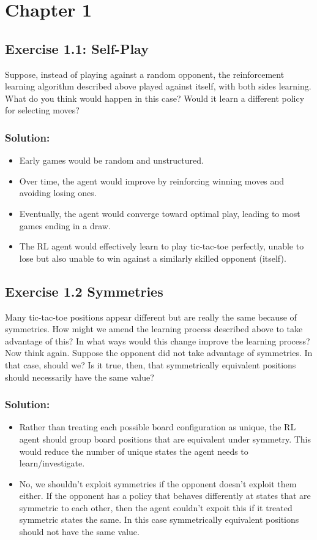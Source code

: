\section*{Chapter 1}

\subsection*{Exercise 1.1: Self-Play} 
Suppose, instead of playing against a random opponent, the
reinforcement learning algorithm described above played against itself, with both sides
learning. What do you think would happen in this case? Would it learn a different policy
for selecting moves? 

\subsubsection*{Solution:}
\begin{itemize}
    \item Early games would be random and unstructured.
    \item Over time, the agent would improve by reinforcing winning moves and avoiding losing ones.
    \item Eventually, the agent would converge toward optimal play, leading to most games ending in a draw.
    \item The RL agent would effectively learn to play tic-tac-toe perfectly, unable to lose but also unable to win against a similarly skilled opponent (itself).
  \end{itemize}

\subsection*{Exercise 1.2 Symmetries} 
Many tic-tac-toe positions appear different but are really
the same because of symmetries. How might we amend the learning process described
above to take advantage of this? In what ways would this change improve the learning
process? Now think again. Suppose the opponent did not take advantage of symmetries.
In that case, should we? Is it true, then, that symmetrically equivalent positions should
necessarily have the same value?

\subsubsection*{Solution:}
\begin{itemize}
    \item Rather than treating each possible board configuration as unique, the RL agent should group board positions that are equivalent under symmetry. This would reduce the number of unique states the agent needs to learn/investigate.
    \item No, we shouldn't exploit symmetries if the opponent doesn't exploit them either. If the opponent has a policy that behaves differently at states that are symmetric to each other, then the agent couldn't expoit this if it treated symmetric states the same. In this case symmetrically equivalent positions should not have the same value.
  \end{itemize}

